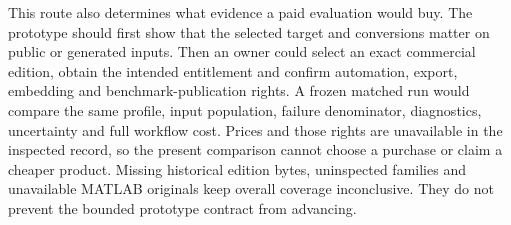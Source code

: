 This route also determines what evidence a paid evaluation would buy. The
prototype should first show that the selected target and conversions matter
on public or generated inputs. Then an owner could select an exact commercial
edition, obtain the intended entitlement and confirm automation, export,
embedding and benchmark-publication rights. A frozen matched run would compare
the same profile, input population, failure denominator, diagnostics,
uncertainty and full workflow cost. Prices and those rights are unavailable
in the inspected record, so the present comparison cannot choose a purchase
or claim a cheaper product. Missing historical edition bytes, uninspected
families and unavailable MATLAB originals keep overall coverage inconclusive.
They do not prevent the bounded prototype contract from advancing.
\citep{exec16_commercial_matrix}
\label{exec16:commercial-matrix-end}
